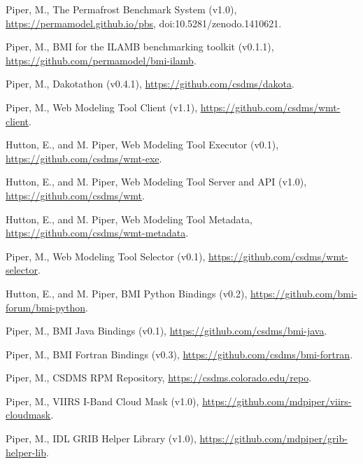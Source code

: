 \documentclass[letterpaper]{resume}
\begin{document}
\begin{enumerate}[{[}1{]}]

  \item Piper, M., The Permafrost Benchmark System (v1.0),
    \url{https://permamodel.github.io/pbs},
    {doi:10.5281/zenodo.1410621}.

  \item Piper, M., BMI for the ILAMB benchmarking toolkit (v0.1.1),
    \url{https://github.com/permamodel/bmi-ilamb}.

  \item Piper, M., Dakotathon (v0.4.1),
    \url{https://github.com/csdms/dakota}.

  \item Piper, M., Web Modeling Tool Client (v1.1),
    \url{https://github.com/csdms/wmt-client}.

  \item Hutton, E., and M. Piper, Web Modeling Tool Executor (v0.1),
    \url{https://github.com/csdms/wmt-exe}.

  \item Hutton, E., and M. Piper, Web Modeling Tool Server and API (v1.0),
    \url{https://github.com/csdms/wmt}.

  \item Hutton, E., and M. Piper, Web Modeling Tool Metadata,
    \url{https://github.com/csdms/wmt-metadata}.

  \item Piper, M., Web Modeling Tool Selector (v0.1),
    \url{https://github.com/csdms/wmt-selector}.

  \item Hutton, E., and M. Piper, BMI Python Bindings (v0.2),
    \url{https://github.com/bmi-forum/bmi-python}.

  \item Piper, M., BMI Java Bindings (v0.1),
    \url{https://github.com/csdms/bmi-java}.

  \item Piper, M., BMI Fortran Bindings (v0.3),
    \url{https://github.com/csdms/bmi-fortran}.

  \item Piper, M., CSDMS RPM Repository,
    \url{https://csdms.colorado.edu/repo}.

  \item Piper, M., VIIRS I-Band Cloud Mask (v1.0),
    \url{https://github.com/mdpiper/viirs-cloudmask}.

  \item Piper, M., IDL GRIB Helper Library (v1.0),
    \url{https://github.com/mdpiper/grib-helper-lib}.

\end{enumerate}
\end{document}
